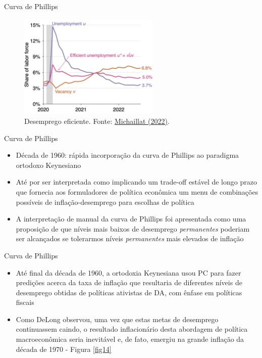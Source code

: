 \documentclass[10pt]{beamer}
\begin{document}
\begin{frame}{Curva de Phillips}
    \begin{figure}
        \centering
        \includegraphics[width=0.6\textwidth]{./figures/aula8_fig8.PNG}
        \caption{Desemprego eficiente. Fonte: \href{https://pmichaillat.substack.com/p/the-us-labor-market-continues-to}{Michaillat (2022)}.}
        \label{fig:uv}
    \end{figure}
\end{frame}

\begin{frame}{Curva de Phillips}
    \begin{itemize}
        \item Década de 1960: rápida incorporação da curva de Phillips ao paradigma ortodoxo Keynesiano
        \bigskip
        \item Até por ser interpretada como implicando um trade-off estável de longo prazo que fornecia aos formuladores de política econômica um menu de combinações possíveis de inflação-desemprego para escolhas de política
        \bigskip
        \item A interpretação de manual da curva de Phillips foi apresentada como uma proposição de que níveis mais baixos de desemprego \emph{permanentes} poderiam ser alcançados se tolerarmos níveis \emph{permanentes} mais elevados de inflação
    \end{itemize}
\end{frame}

\begin{frame}{Curva de Phillips}
    \begin{itemize}
        \item Até final da década de 1960, a ortodoxia Keynesiana usou PC para fazer predições acerca da taxa de inflação que resultaria de diferentes níveis de desemprego obtidas de políticas ativistas de DA, com ênfase em políticas fiscais
        \bigskip
        \item Como DeLong observou, uma vez que estas metas de desemprego continuassem caindo, o resultado inflacionário desta abordagem de política macroeconômica seria inevitável e, de fato, emergiu na grande inflação da década de 1970 - Figura \ref{fig14}
    \end{itemize}
\end{frame}
\end{document}
